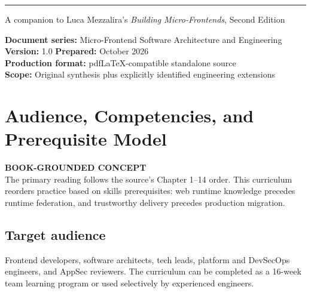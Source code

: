 \documentclass[11pt,letterpaper,oneside]{report}
\newcommand{\based}[1]{\begin{sourcebox}\textbf{BOOK-GROUNDED CONCEPT}\\#1\end{sourcebox}}
\begin{document}
\hypersetup{pageanchor=false}%
\begin{titlepage}\thispagestyle{empty}
\vspace{27pt}\noindent\color{blue}\rule{0.75\textwidth}{1.4pt}
\vspace{23pt}\par{\large\sffamily A companion to Luca Mezzalira's \emph{Building Micro-Frontends}, Second Edition}\par
\vfill\noindent\textbf{Document series:} Micro-Frontend Software Architecture and Engineering\\
\textbf{Version:} 1.0 \quad \textbf{Prepared:} October 2026\\
\textbf{Production format:} pdfLaTeX-compatible standalone source\\
\textbf{Scope:} Original synthesis plus explicitly identified engineering extensions
\end{titlepage}\hypersetup{pageanchor=true}
\tableofcontents\clearpage{}

\chapter{Audience, Competencies, and Prerequisite Model}
\based{The primary reading follows the source's Chapter 1--14 order. This curriculum reorders practice based on skills prerequisites: web runtime knowledge precedes runtime federation, and trustworthy delivery precedes production migration.}
\section{Target audience}
Frontend developers, software architects, tech leads, platform and DevSecOps engineers, and AppSec reviewers. The curriculum can be completed as a 16-week team learning program or used selectively by experienced engineers.
\end{document}
